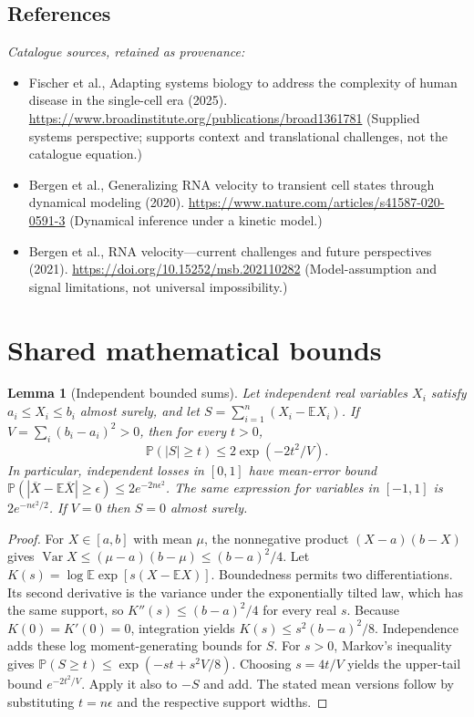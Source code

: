 \documentclass[11pt]{article}
\newcommand{\E}{\mathbb E}
\newcommand{\Prob}{\mathbb P}
\DeclareMathOperator{\Var}{Var}
\providecommand{\E}{\mathbb E}
\providecommand{\Prob}{\mathbb P}
\providecommand{\Var}{\operatorname{Var}}
\newtheorem{sharedlemma}{Lemma}[section]
\begin{document}
\subsection{References}
\noindent\emph{Catalogue sources, retained as provenance:}
\begin{itemize}
\item Fischer et al., Adapting systems biology to address the complexity of human disease in the single-cell era (2025). \url{https://www.broadinstitute.org/publications/broad1361781} (Supplied systems perspective; supports context and translational challenges, not the catalogue equation.)
\item Bergen et al., Generalizing RNA velocity to transient cell states through dynamical modeling (2020). \url{https://www.nature.com/articles/s41587-020-0591-3} (Dynamical inference under a kinetic model.)
\item Bergen et al., RNA velocity---current challenges and future perspectives (2021). \url{https://doi.org/10.15252/msb.202110282} (Model-assumption and signal limitations, not universal impossibility.)
\end{itemize}
\clearpage


\appendix
\section{Shared mathematical bounds}\label{app:bounds}
\begin{sharedlemma}[Independent bounded sums]\label{lem:bounded}
Let independent real variables $X_i$ satisfy $a_i\leq X_i\leq b_i$ almost surely,
and let $S=\sum_{i=1}^n(X_i-\E X_i)$. If
$V=\sum_i(b_i-a_i)^2>0$, then for every $t>0$,
\[
 \Prob(|S|\geq t)\leq 2\exp(-2t^2/V).
\]
In particular, independent losses in $[0,1]$ have mean-error bound
$\Prob(|\overline X-\E\overline X|\geq\epsilon)
\leq2e^{-2n\epsilon^2}$. The same expression for variables in $[-1,1]$
is $2e^{-n\epsilon^2/2}$. If $V=0$ then $S=0$ almost surely.
\end{sharedlemma}
\begin{proof}
For $X\in[a,b]$ with mean $\mu$, the nonnegative product
$(X-a)(b-X)$ gives
$\Var X\leq(\mu-a)(b-\mu)\leq(b-a)^2/4$.
Let $K(s)=\log\E\exp[s(X-\E X)]$.
Boundedness permits two differentiations. Its second derivative is the variance
under the exponentially tilted law, which has the same support, so
$K''(s)\leq(b-a)^2/4$ for every real $s$.
Because $K(0)=K'(0)=0$, integration yields
$K(s)\leq s^2(b-a)^2/8$.
Independence adds these log moment-generating bounds for $S$.
For $s>0$, Markov's inequality gives
$\Prob(S\geq t)\leq\exp(-st+s^2V/8)$.
Choosing $s=4t/V$ yields the upper-tail bound $e^{-2t^2/V}$.
Apply it also to $-S$ and add. The stated mean versions follow by substituting
$t=n\epsilon$ and the respective support widths.
\end{proof}
\end{document}
